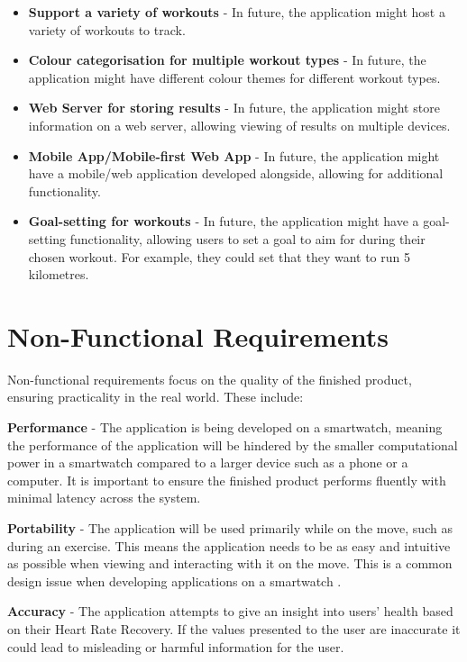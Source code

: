 \documentclass{l4proj}
\begin{document}
\begin{itemize}
    \item \textbf{Support a variety of workouts} - In future, the application might host a variety of workouts to track.
    \item \textbf{Colour categorisation for multiple workout types} - In future, the application might have different colour themes for different workout types.
    \item \textbf{Web Server for storing results} - In future, the application might store information on a web server, allowing viewing of results on multiple devices.
    \item \textbf{Mobile App/Mobile-first Web App} - In future, the application might have a mobile/web application developed alongside, allowing for additional functionality.
    \item \textbf{Goal-setting for workouts} - In future, the application might have a goal-setting functionality, allowing users to set a goal to aim for during their chosen workout. For example, they could set that they want to run 5 kilometres.
\end{itemize}

\section{Non-Functional Requirements}
\label{sec:nonfunctionalreqs}

Non-functional requirements focus on the quality of the finished product, ensuring practicality in the real world. These include:

\textbf{Performance} - The application is being developed on a smartwatch, meaning the performance of the application will be hindered by the smaller computational power in a smartwatch compared to a larger device such as a phone or a computer. It is important to ensure the finished product performs fluently with minimal latency across the system.

\textbf{Portability} -  The application will be used primarily while on the move, such as during an exercise. This means the application needs to be as easy and intuitive as possible when viewing and interacting with it on the move. This is a common design issue when developing applications on a smartwatch \cite{TicDesign}.

\textbf{Accuracy} - The application attempts to give an insight into users' health based on their Heart Rate Recovery. If the values presented to the user are inaccurate it could lead to misleading or harmful information for the user.
\end{document}
